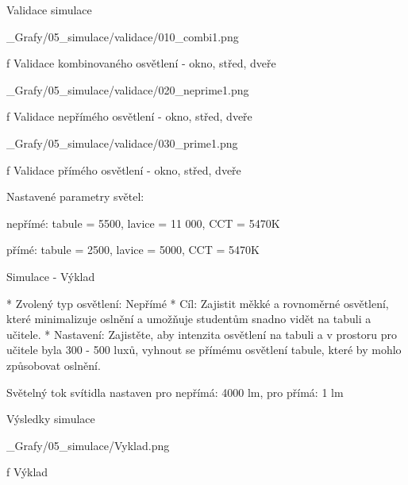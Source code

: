 \secc Validace simulace

\medskip {}
\picw=18cm _Grafy/05_simulace/validace/010_combi1.png
\caption/f Validace kombinovaného osvětlení - okno, střed, dveře
\medskip

\medskip {}
\picw=18cm _Grafy/05_simulace/validace/020_neprime1.png
\caption/f Validace nepřímého osvětlení - okno, střed, dveře
\medskip

\medskip {}
\picw=18cm _Grafy/05_simulace/validace/030_prime1.png
\caption/f Validace přímého osvětlení - okno, střed, dveře
\medskip

Nastavené parametry světel:

nepřímé: tabule = 5500, lavice = 11 000, CCT = 5470K

přímé: tabule = 2500, lavice = 5000, CCT = 5470K









\sec Simulace - Výklad

\begitems
* Zvolený typ osvětlení: Nepřímé
* Cíl: Zajistit měkké a rovnoměrné osvětlení, které minimalizuje oslnění a umožňuje studentům snadno vidět na tabuli a učitele.
* Nastavení: Zajistěte, aby intenzita osvětlení na tabuli a v prostoru pro učitele byla 300 - 500 luxů, vyhnout se přímému osvětlení tabule, které by mohlo způsobovat oslnění.
\enditems

\noindent Světelný tok svítidla nastaven pro nepřímá: 4000 lm, pro přímá: 1 lm

\secc Výsledky simulace

\medskip {}
\picw=10cm _Grafy/05_simulace/Vyklad.png
\caption/f Výklad
\medskip


